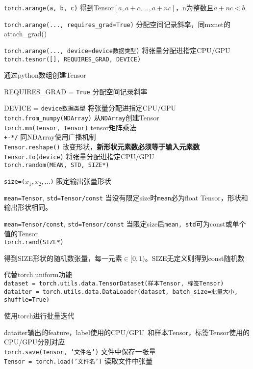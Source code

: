 \documentclass[UTF8]{ctexart}
\begin{document}
  \texttt{torch.arange(a, b, c)} 得到Tensor$[a, a+c, ..., a+nc]$，n为整数且$a+nc < b$
  
  \texttt{torch.arange(..., requires\_grad=True)} 分配空间记录斜率，同mxnet的attach\_grad()
  
  \texttt{torch.arange(..., device=device数据类型)} 将张量分配进指定CPU/GPU\\
\texttt{torch.tesnor([], REQUIRES\_GRAD, DEVICE)}
  
  通过python数组创建Tensor

  REQUIRES\_GRAD = \texttt{True} 分配空间记录斜率
  
  DEVICE = \texttt{device数据类型} 将张量分配进指定CPU/GPU\\
\texttt{torch.from\_numpy(NDArray)} 从\texttt{NDArray}创建Tensor\\
\texttt{torch.mm(Tensor, Tensor)} tensor矩阵乘法\\
\texttt{+-*/} 同NDArray使用广播机制\\
\texttt{Tensor.reshape()} 改变形状，\textbf{新形状元素数必须等于输入元素数}\\
\texttt{Tensor.to(device)} 将张量分配进指定CPU/GPU\\
\texttt{torch.random(MEAN, STD, SIZE*)}

  \texttt{size=($x_1, x_2, ...$)} 限定输出张量形状

  \texttt{mean=Tensor}, \texttt{std=Tensor/const} 当没有限定size时\texttt{mean}必为float Tensor，形状和输出形状相同。

  \texttt{mean=Tensor/const}, \texttt{std=Tensor/const} 当限定size后\texttt{mean, std}可为const或单个值的Tensor\\
\texttt{torch.rand(SIZE*)}

  得到SIZE形状的随机数张量，每一元素$\in [0,1)$。SIZE无定义则得到const随机数

  代替torch.uniform功能\\
\texttt{dataset = torch.utils.data.TensorDataset(样本Tensor, 标签Tensor)}\\
\texttt{dataiter = torch.utils.data.DataLoader(dataset, batch\_size=批量大小, shuffle=True)}

  使用torch进行批量迭代
  
  dataiter输出的feature，label使用的CPU/GPU\ 和样本Tensor，标签Tensor使用的CPU/GPU分别对应\\
\texttt{torch.save(Tensor, '文件名')} 文件中保存一张量\\
\texttt{Tensor = torch.load('文件名')} 读取文件中张量
\end{document}
